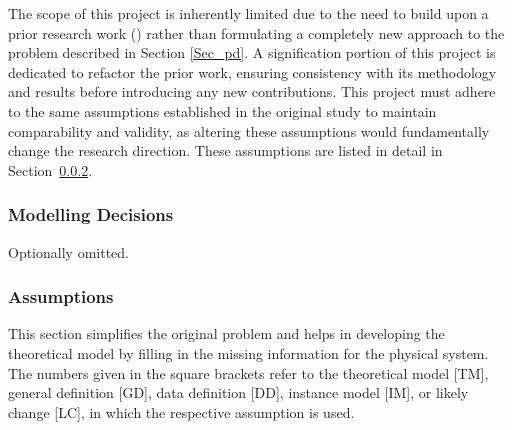 \documentclass[12pt]{article}
\begin{document}
The scope of this project is inherently limited due to the need to build upon a
prior research work (\cite{wong_exploring_2024}) rather than formulating a
completely new approach to the problem described in Section \ref{Sec_pd}. A
signification portion of this project is dedicated to refactor the prior work,
ensuring consistency with its methodology and results before introducing any new
contributions. This project must adhere to the same assumptions established in
the original study to maintain comparability and validity, as altering these
assumptions would fundamentally change the research direction. These assumptions
are listed in detail in Section~\ref{sec_assumpt}.

\subsubsection{Modelling Decisions}


Optionally omitted.

\subsubsection{Assumptions} \label{sec_assumpt}


This section simplifies the original problem and helps in developing the
theoretical model by filling in the missing information for the physical system.
The numbers given in the square brackets refer to the theoretical model [TM],
general definition [GD], data definition [DD], instance model [IM], or likely
change [LC], in which the respective assumption is used.
\end{document}
